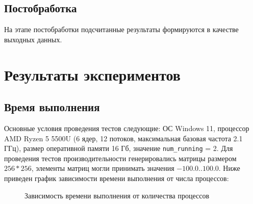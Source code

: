 \documentclass[a4paper,12pt]{article}
\begin{document}
\subsection{Постобработка}
На этапе постобработки подсчитанные результаты формируются в качестве выходных данных.

\section{Результаты экспериментов}
\subsection{Время выполнения}
Основные условия проведения тестов следующие: ОС Windows 11, процессор AMD Ryzen 5 5500U (6 ядер, 12 потоков, максимальная базовая частота 2.1 ГГц), размер оперативной памяти 16 Гб, значение \texttt{num\_running} = 2. Для проведения тестов производительности генерировались матрицы размером $256*256$, элементы матриц могли принимать значения $-100.0..100.0$.
Ниже приведен график зависимости времени выполнения от числа процессов: 

\begin{figure}[H]
    \centering
    \caption{Зависимость времени выполнения от количества процессов}
    \label{fig:runtime}
\end{figure}
\end{document}
